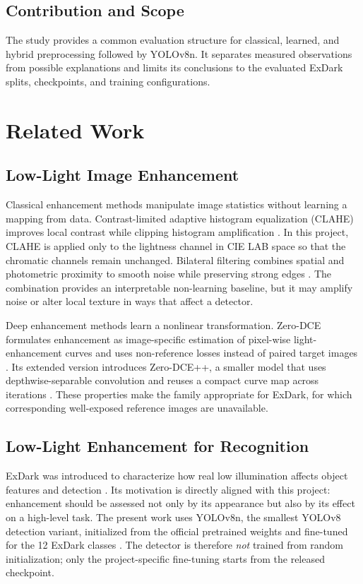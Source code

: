 \documentclass[11pt,a4paper]{article}
\begin{document}
\subsection{Contribution and Scope}

The study provides a common evaluation structure for classical, learned, and
hybrid preprocessing followed by YOLOv8n. It separates measured observations
from possible explanations and limits its conclusions to the evaluated ExDark
splits, checkpoints, and training configurations.

\section{Related Work}

\subsection{Low-Light Image Enhancement}

Classical enhancement methods manipulate image statistics without learning a
mapping from data. Contrast-limited adaptive histogram equalization (CLAHE)
improves local contrast while clipping histogram amplification
\cite{zuiderveld1994clahe}. In this project, CLAHE is applied only to the
lightness channel in CIE LAB space so that the chromatic channels remain
unchanged. Bilateral filtering combines spatial and photometric proximity to
smooth noise while preserving strong edges \cite{tomasi1998bilateral}. The
combination provides an interpretable non-learning baseline, but it may amplify
noise or alter local texture in ways that affect a detector.

Deep enhancement methods learn a nonlinear transformation. Zero-DCE formulates
enhancement as image-specific estimation of pixel-wise light-enhancement curves
and uses non-reference losses instead of paired target images
\cite{guo2020zerodce}. Its extended version introduces Zero-DCE++, a smaller
model that uses depthwise-separable convolution and reuses a compact curve map
across iterations \cite{li2021zerodce}. These properties make the family
appropriate for ExDark, for which corresponding well-exposed reference images
are unavailable.

\subsection{Low-Light Enhancement for Recognition}

ExDark was introduced to characterize how real low illumination affects object
features and detection \cite{loh2019exdark}. Its motivation is directly aligned
with this project: enhancement should be assessed not only by its appearance but
also by its effect on a high-level task. The present work uses YOLOv8n, the
smallest YOLOv8 detection variant, initialized from the official pretrained
weights and fine-tuned for the 12 ExDark classes \cite{ultralytics2023yolov8}.
The detector is therefore \emph{not} trained from random initialization; only
the project-specific fine-tuning starts from the released checkpoint.
\end{document}

